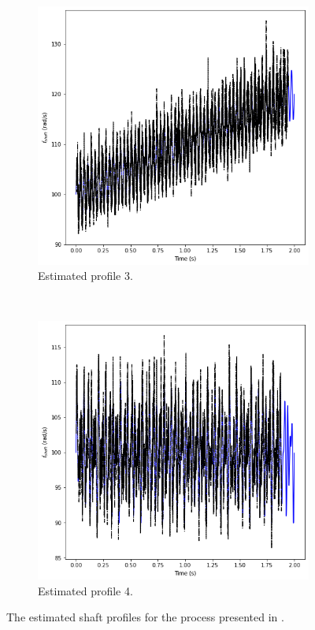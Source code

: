 \documentclass{article}
\begin{document}
\begin{figure}[htb!]
		\begin{subfigure}[b]{0.45\textwidth}
			\centering
			\includegraphics[width=\textwidth]{Q4_f3_3.png}
			\caption{Estimated profile 3.}
		\end{subfigure}
		~
		\begin{subfigure}[b]{0.45\textwidth}
			\centering
			\includegraphics[width=\textwidth]{Q4_f4_3.png}
			\caption{Estimated profile 4.}
		\end{subfigure}
		
		\caption{The estimated shaft profiles for the process presented in \cite{Diamond2016}.}
		\label{fig:Q4_estimated_profiles_BGC}
	\end{figure}
	
\end{document}
